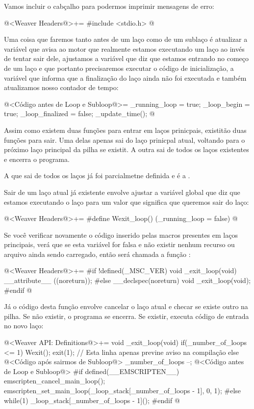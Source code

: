 Vamos incluir o cabçalho para podermos imprimir mensagens de erro:

@<Weaver Headers@>+=
#include <stdio.h>
@

Uma coisa que faremos tanto antes de um laço como de um sublaço é
atualizar a variável  que avisa ao motor
que realmente estamos executando um laço ao invés de tentar sair dele,
ajustamos a variável que diz que estamos entrando no começo de um laço
e que portanto precisaremos executar o código de inicialização, a
variável que informa que a finalização do laço ainda não foi executada
e também atualizamos nosso contador de tempo:

\iniciocodigo
@<Código antes de Loop e Subloop@>=
_running_loop = true;
_loop_begin = true;
_loop_finalized = false;
_update_time();
@
\fimcodigo


Assim como existem duas funções para entrar em laços prinicpais,
existitão duas funções para sair. Uma delas apenas sai do laço
prinicpal atual, voltando para o próximo laço principal da pilha se
existit. A outra sai de todos os laços existentes e encerra o
programa.

A que sai de todos os laços já foi parcialmetne definida e é
a .

Sair de um laço atual já existente envolve ajustar a variável global
que diz que estamos executando o laço para um valor que significa que
queremos sair do laço:

\iniciocodigo
@<Weaver Headers@>+=
#define Wexit_loop() (_running_loop = false)
@
\fimcodigo

Se você verificar novamente o código inserido pelas macros presentes
em laços principais, verá que se esta variável for falsa e não existir
nenhum recurso ou arquivo ainda sendo carregado, então será chamada a
função :

\iniciocodigo
@<Weaver Headers@>+=
#if !defined(_MSC_VER)
void _exit_loop(void) __attribute__ ((noreturn));
#else
__declspec(noreturn) void _exit_loop(void);
#endif
@
\fimcodigo

Já o código desta função envolve cancelar o laço atual e checar se
existe outro na pilha. Se não existir, o programa se encerra. Se
existir, executa código de entrada no novo laço:

\iniciocodigo
@<Weaver API: Definitions@>+=
void _exit_loop(void){
  if(_number_of_loops <= 1){
    Wexit();
    exit(1); // Esta linha apenas previne aviso na compilação
  }
  else{
    @<Código após sairmos de Subloop@>
    _number_of_loops --;
    @<Código antes de Loop e Subloop@>
#if defined(__EMSCRIPTEN__)
    emscripten_cancel_main_loop();
    emscripten_set_main_loop(_loop_stack[_number_of_loops - 1], 0, 1);
#else
    while(1)
      _loop_stack[_number_of_loops - 1]();
#endif
  }
}
@
\fimcodigo

